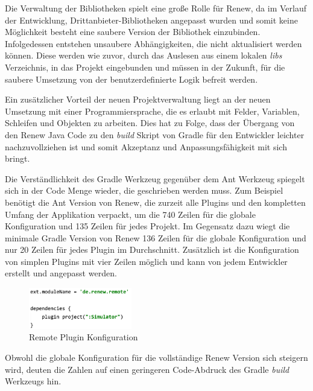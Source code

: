 	Die Verwaltung der Bibliotheken spielt eine große Rolle für Renew, da im Verlauf der Entwicklung, Drittanbieter-Bibliotheken angepasst wurden und somit keine Möglichkeit besteht eine saubere Version der Bibliothek einzubinden. Infolgedessen entstehen  unsaubere Abhängigkeiten, die nicht aktualisiert werden können. Diese werden wie zuvor, durch das Auslesen aus einem lokalen \textit{libs} Verzeichnis, in das Projekt eingebunden und müssen in der Zukunft, für die saubere Umsetzung von der benutzerdefinierte Logik befreit werden.\bigbreak

	Ein zusätzlicher Vorteil der neuen Projektverwaltung liegt an der neuen Umsetzung mit einer Programmiersprache, die es erlaubt mit Felder, Variablen, Schleifen und Objekten zu arbeiten. Dies hat zu Folge, dass der Übergang von den Renew Java Code zu den \textit{build} Skript von Gradle für den Entwickler leichter nachzuvollziehen ist und somit Akzeptanz und Anpassungsfähigkeit mit sich bringt. \newline

	Die Verständlichkeit des Gradle Werkzeug gegenüber dem Ant Werkzeug spiegelt sich in der Code Menge wieder, die geschrieben werden muss. Zum Beispiel benötigt die Ant Version von Renew, die zurzeit alle Plugins und den kompletten Umfang der Applikation verpackt, um die 740 Zeilen für die globale Konfiguration und 135 Zeilen für jedes Projekt. Im Gegensatz dazu wiegt die minimale Gradle Version von Renew 136 Zeilen für die globale Konfiguration und nur 20 Zeilen für jedes Plugin im Durchschnitt. Zusätzlich ist die Konfiguration von simplen Plugins mit vier Zeilen möglich und kann von jedem Entwickler erstellt und angepasst werden.

	\begin{figure}[h!]
	  \centering
	  \includegraphics[width=0.4\textwidth]{material/images/Remote_config.png}
	  \caption{Remote Plugin Konfiguration}
	  \label{fig:remote_config}
	\end{figure}	

	Obwohl die globale Konfiguration für die vollständige Renew Version sich steigern wird, deuten die Zahlen auf einen geringeren Code-Abdruck des Gradle \textit{build} Werkzeugs hin.\newpage

